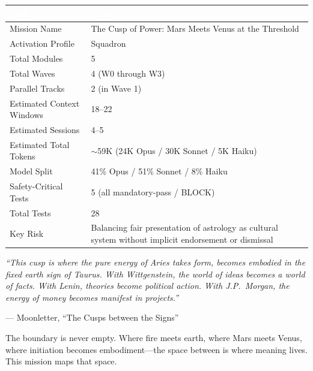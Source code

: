 \documentclass[11pt,letterpaper]{article}
\newcommand{\tableheader}[1]{\textbf{\sffamily\textcolor{white}{#1}}}
\begin{document}
\begin{center}
\begin{tabularx}{\textwidth}{L{5cm}X}
\toprule
{}
\tableheader{Metric} & \tableheader{Value} \\
\midrule
Mission Name & The Cusp of Power: Mars Meets Venus at the Threshold \\
Activation Profile & Squadron \\
Total Modules & 5 \\
Total Waves & 4 (W0 through W3) \\
Parallel Tracks & 2 (in Wave 1) \\
Estimated Context Windows & 18--22 \\
Estimated Sessions & 4--5 \\
Estimated Total Tokens & $\sim$59K (24K Opus / 30K Sonnet / 5K Haiku) \\
Model Split & 41\% Opus / 51\% Sonnet / 8\% Haiku \\
Safety-Critical Tests & 5 (all mandatory-pass / BLOCK) \\
Total Tests & 28 \\
Key Risk & Balancing fair presentation of astrology as cultural system without implicit endorsement or dismissal \\
\bottomrule
\end{tabularx}
\end{center}

\vspace{1em}

\begin{quotebox}
\textit{``This cusp is where the pure energy of Aries takes form, becomes embodied in the fixed earth sign of Taurus. With Wittgenstein, the world of ideas becomes a world of facts. With Lenin, theories become political action. With J.P.\ Morgan, the energy of money becomes manifest in projects.''}

\vspace{0.5em}
\hfill --- Moonletter, ``The Cusps between the Signs''

\vspace{1em}
The boundary is never empty. Where fire meets earth, where Mars meets Venus, where initiation becomes embodiment---the space between is where meaning lives. This mission maps that space.
\end{quotebox}
\end{document}
